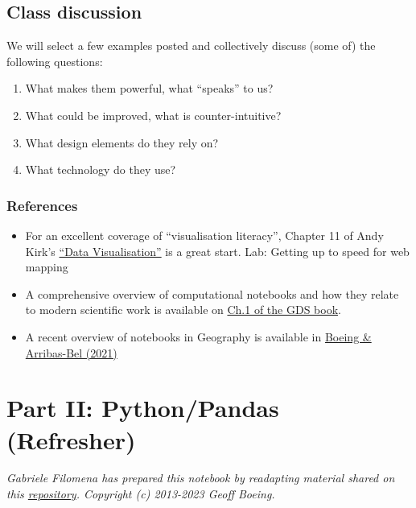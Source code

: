 \documentclass[
  letterpaper,
  DIV=11,
  numbers=noendperiod]{scrreprt}
\providecommand{\tightlist}{%
  \setlength{\itemsep}{0pt}\setlength{\parskip}{0pt}}\usepackage{longtable,booktabs,array}
\begin{document}
\subsection{Class discussion}\label{class-discussion}

We will select a few examples posted and collectively discuss (some of)
the following questions:

\begin{enumerate}
\def\labelenumi{\arabic{enumi}.}
\tightlist
\item
  What makes them powerful, what ``speaks'' to us?
\item
  What could be improved, what is counter-intuitive?
\item
  What design elements do they rely on?
\item
  What technology do they use?
\end{enumerate}

\subsubsection{References}\label{references}

\begin{itemize}
\tightlist
\item
  For an excellent coverage of ``visualisation literacy'', Chapter 11 of
  Andy Kirk's \href{https://www.visualisingdata.com/book/}{``Data
  Visualisation''} is a great start. Lab: Getting up to speed for web
  mapping
\item
  A comprehensive overview of computational notebooks and how they
  relate to modern scientific work is available on
  \href{https://geographicdata.science/book/notebooks/01_geo_thinking.html}{Ch.1
  of the GDS book}.
\item
  A recent overview of notebooks in Geography is available in
  \href{https://gistbok.ucgis.org/bok-topics/gis-and-computational-notebooks}{Boeing
  \& Arribas-Bel (2021)}
\end{itemize}

\section{Part II: Python/Pandas
(Refresher)}\label{part-ii-pythonpandas-refresher}

\emph{Gabriele Filomena has prepared this notebook by readapting
material shared on this
\href{https://github.com/gboeing/ppd599/tree/main}{repository}.
Copyright (c) 2013-2023 Geoff Boeing.}
\end{document}
